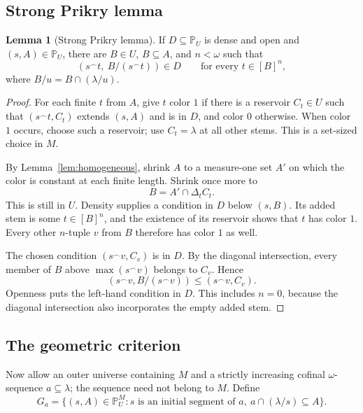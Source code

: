\documentclass[11pt,letterpaper]{article}
\theoremstyle{definition}
\newtheorem{lemma}[definition]{Lemma}
\numberwithin{equation}{section}
\begin{document}
\subsection{Strong Prikry lemma}

\begin{lemma}[Strong Prikry lemma]\label{lem:strongprikry}
If $D\subseteq\mathbb P_U$ is dense and open and $(s,A)\in\mathbb P_U$, there are $B\in U$, $B\subseteq A$, and $n<\omega$ such that
\[
 (s^\frown t,\ B/(s^\frown t))\in D
 \qquad\text{for every }t\in[B]^n,
\]
where $B/u=B\cap(\lambda/u)$.
\end{lemma}

\begin{proof}
For each finite $t$ from $A$, give $t$ color $1$ if there is a reservoir $C_t\in U$ such that $(s^\frown t,C_t)$ extends $(s,A)$ and is in $D$, and color $0$ otherwise. When color $1$ occurs, choose such a reservoir; use $C_t=\lambda$ at all other stems. This is a set-sized choice in $M$.

By Lemma~\ref{lem:homogeneous}, shrink $A$ to a measure-one set $A'$ on which the color is constant at each finite length. Shrink once more to
\[
 B=A'\cap\Delta_t C_t.
\]
This is still in $U$. Density supplies a condition in $D$ below $(s,B)$. Its added stem is some $t\in[B]^n$, and the existence of its reservoir shows that $t$ has color $1$. Every other $n$-tuple $v$ from $B$ therefore has color $1$ as well.

The chosen condition $(s^\frown v,C_v)$ is in $D$. By the diagonal intersection, every member of $B$ above $\max(s^\frown v)$ belongs to $C_v$. Hence
\[
 (s^\frown v,B/(s^\frown v))\le(s^\frown v,C_v).
\]
Openness puts the left-hand condition in $D$. This includes $n=0$, because the diagonal intersection also incorporates the empty added stem.
\end{proof}

\subsection{The geometric criterion}

Now allow an outer universe containing $M$ and a strictly increasing cofinal $\omega$-sequence $a\subseteq\lambda$; the sequence need not belong to $M$. Define
\begin{equation}\label{eq:Gc}
 G_a=\{(s,A)\in\mathbb P_U^M:
      s\text{ is an initial segment of }a,
      \ a\cap(\lambda/s)\subseteq A\}.
\end{equation}
\end{document}
